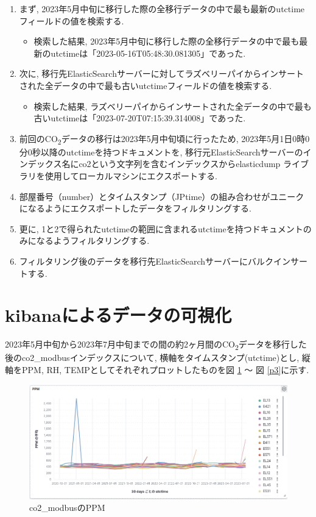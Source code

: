 \documentclass[a4j,12pt,]{jarticle}
\begin{document}
\begin{enumerate}
  \item まず, 2023年5月中旬に移行した際の全移行データの中で最も最新のutctimeフィールドの値を検索する.
  \begin{itemize}
    \item 検索した結果, 2023年5月中旬に移行した際の全移行データの中で最も最新のutctimeは「2023-05-16T05:48:30.081305」であった.
  \end{itemize}
  \item 次に, 移行先ElasticSearchサーバーに対してラズベリーパイからインサートされた全データの中で最も古いutctimeフィールドの値を検索する.
  \begin{itemize}
    \item 検索した結果, ラズベリーパイからインサートされた全データの中で最も古いutctimeは「2023-07-20T07:15:39.314008」であった.
  \end{itemize}
  \item 前回のCO\textsubscript{2}データの移行は2023年5月中旬頃に行ったため, 2023年5月1日0時0分0秒以降のutctimeを持つドキュメントを, 移行元ElasticSearchサーバーのインデックス名にco2という文字列を含むインデックスからelasticdump \cite{1}ライブラリを使用してローカルマシンにエクスポートする.
  \item 部屋番号（number）とタイムスタンプ（JPtime）の組み合わせがユニークになるようにエクスポートしたデータをフィルタリングする.
  \item 更に, 1と2で得られたutctimeの範囲に含まれるutctimeを持つドキュメントのみになるようフィルタリングする.
  \item フィルタリング後のデータを移行先ElasticSearchサーバーにバルクインサートする.
\end{enumerate}

\section{kibanaによるデータの可視化}

2023年5月中旬から2023年7月中旬までの間の約2ヶ月間のCO\textsubscript{2}データを移行した後のco2\_modbusインデックスについて, 横軸をタイムスタンプ(utctime)とし, 縦軸をPPM, RH, TEMPとしてそれぞれプロットしたものを図 \ref{p1} 〜 図 \ref{p3}に示す.

\begin{figure}[H]
  \begin{center}
    \includegraphics[width=160mm]{ppm.png}
    \caption{co2\_modbusのPPM}
    \label{p1}
  \end{center}
\end{figure}
\end{document}
